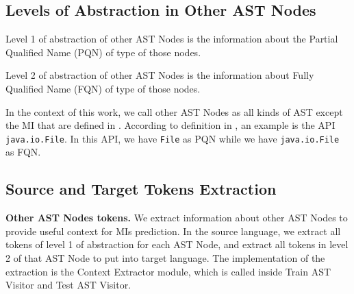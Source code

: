 \subsection{Levels of Abstraction in Other AST Nodes}
\begin{definition}
Level 1 of abstraction of other AST Nodes is the information about the Partial Qualified Name (PQN) of type of those nodes.
\end{definition}
\begin{definition}
Level 2 of abstraction of other AST Nodes is the information about Fully Qualified Name (FQN) of type of those nodes.
\end{definition}
In the context of this work, we call other AST Nodes as all kinds of AST except the MI that are defined in \cite{id:ASTDocumentation}. According to definition in \cite{8453132}, an example is the API \texttt{java.io.File}. In this API, we have \texttt{File} as PQN while we have \texttt{java.io.File} as FQN.

\subsection{Source and Target Tokens Extraction}
\textbf{Other AST Nodes tokens.} We extract information about other AST Nodes to provide useful context for MIs prediction. In the source language, we extract all tokens of level 1 of abstraction for each AST Node, and extract all tokens in level 2 of that AST Node to put into target language. The implementation of the extraction is the Context Extractor module, which is called inside Train AST Visitor and Test AST Visitor. 

